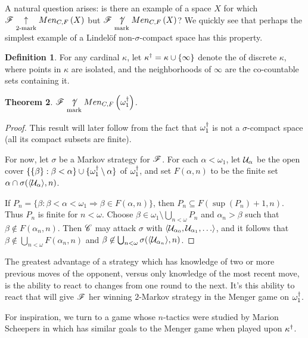 \documentclass{amsart}
\newtheorem{theorem}{Theorem}[section]
\theoremstyle{definition}
\newtheorem{definition}[theorem]{Definition}
\begin{document}
A natural question arises: is there an example of a space \(X\) for which
\(\mathscr{F}\underset{2\text{-mark}}{\uparrow}Men_{C,F}\left({X}\right)\) but \(\mathscr{F}\underset{\text{mark}}{\not\uparrow}Men_{C,F}\left({X}\right)\)? We quickly
see that perhaps the simplest example of a Lindel\"of non-\(\sigma\)-compact
space has this property.

\begin{definition}
  For any cardinal \(\kappa\), let \(\kappa^\dagger=\kappa\cup\{\infty\}\) denote
  the  of discrete \(\kappa\), where points in
  \(\kappa\) are isolated, and the neighborhoods of \(\infty\) are the co-countable
  sets containing it.
\end{definition}

\begin{theorem}
  \(\mathscr{F} \underset{\text{mark}}{\not\uparrow} Men_{C,F}\left({\omega_1^\dagger}\right)\).
\end{theorem}

\begin{proof}
  This result will later follow from the fact that
  \(\omega^\dagger_1\) is not a \(\sigma\)-compact space (all its compact subsets
  are finite).

  For now, let \(\sigma\) be a Markov strategy for \(\mathscr{F}\). For
  each \(\alpha<\omega_1\), let \(\mathcal{U}_\alpha\) be the open cover
  \(\{\{\beta\}:\beta<\alpha\}\cup\{\omega_1^\dagger\setminus\alpha\}\) of
  \(\omega_1^\dagger\), and set \(F(\alpha,n)\) to be the finite set
  \(\alpha\cap\sigma(\langle\mathcal{U}_\alpha\rangle,n)\).

  If
    \(
      P_n =
      \{\beta: \beta < \alpha < \omega_1 \Rightarrow \beta \in F(\alpha,n)\}
    \),
  then \(P_n\subseteq F(\sup(P_n)+1,n)\). Thus \(P_n\) is finite for \(n<\omega\).
  Choose \(\beta\in\omega_1\setminus \bigcup_{n<\omega}P_n\)
  and \(\alpha_n>\beta\) such that \(\beta\not\in F(\alpha_n,n)\).
  Then \(\mathscr{C}\) may attack
  \(\sigma\) with \(\<\mc U_{\alpha_0}, \mc U_{\alpha_1},\dots\>\),
  and it follows that
  \(\beta\not\in \bigcup_{n<\omega}F(\alpha_n,n)\) and
  \(\beta\not\in \bigcup_{n<\omega}\sigma(\langle\mathcal{U}_{\alpha_n}\rangle,n)\).
\end{proof}

The greatest advantage of a strategy which has knowledge of two or more previous
moves of the opponent, versus only knowledge of the most recent move, is the
ability to react to changes from one round to the next. It's this ability to
react that will give \(\mathscr{F}\) her winning \(2\)-Markov strategy in the Menger
game on \(\omega^\dagger_1\).

For inspiration, we turn to a game whose \(n\)-tactics were studied by Marion
Scheepers in \cite{MR1129143} which has similar goals to the Menger game when
played upon \(\kappa^\dagger\).
\end{document}
